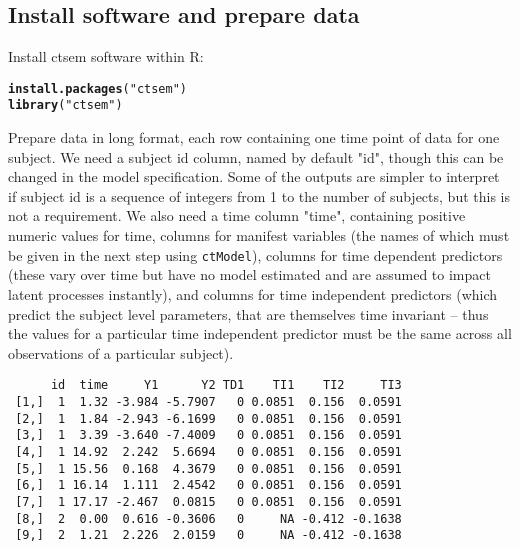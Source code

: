 \documentclass[11pt]{article}\usepackage[]{graphicx}\usepackage[]{color}
\makeatletter
\newcommand{\hlstr}[1]{\textcolor[rgb]{0.192,0.494,0.8}{#1}}%
\newcommand{\hlstd}[1]{\textcolor[rgb]{0.345,0.345,0.345}{#1}}%
\newcommand{\hlkwd}[1]{\textcolor[rgb]{0.737,0.353,0.396}{\textbf{#1}}}%
\newenvironment{kframe}{%
 \def\at@end@of@kframe{}%
 \ifinner\ifhmode%
  \def\at@end@of@kframe{\end{minipage}}%
  \begin{minipage}{\columnwidth}%
 \fi\fi%
 \def\FrameCommand##1{\hskip\@totalleftmargin \hskip-\fboxsep
 \colorbox{shadecolor}{##1}\hskip-\fboxsep
     \hskip-\linewidth \hskip-\@totalleftmargin \hskip\columnwidth}%
 \MakeFramed {\advance\hsize-\width
   \@totalleftmargin\z@ \linewidth\hsize
   \@setminipage}}%
 {\par\unskip\endMakeFramed%
 \at@end@of@kframe}
\newenvironment{knitrout}{}{} %
\makeatother
\begin{document}
\subsection{Install software and prepare data}
Install ctsem software within R:

\begin{knitrout}\small
{}\color{fgcolor}\begin{kframe}
\begin{alltt}
\hlkwd{install.packages}\hlstd{(}\hlstr{"ctsem"}\hlstd{)}
\hlkwd{library}\hlstd{(}\hlstr{"ctsem"}\hlstd{)}
\end{alltt}
\end{kframe}
\end{knitrout}

Prepare data in long format, each row containing one time point of data for one subject. We need a subject id column, named by default "id", though this can be changed in the model specification. Some of the outputs are simpler to interpret if subject id is a sequence of integers from 1 to the number of subjects, but this is not a requirement. We also need a time column "time", containing positive numeric values for time, columns for manifest variables (the names of which must be given in the next step using \verb|ctModel|), columns for time dependent predictors (these vary over time but have no model estimated and are assumed to impact latent processes instantly), and columns for time independent predictors (which predict the subject level parameters, that are themselves time invariant -- thus the values for a particular time independent predictor must be the same across all observations of a particular subject).

\begin{knitrout}\footnotesize
{}\color{fgcolor}\begin{kframe}
\begin{verbatim}
      id  time     Y1      Y2 TD1    TI1    TI2     TI3
 [1,]  1  1.32 -3.984 -5.7907   0 0.0851  0.156  0.0591
 [2,]  1  1.84 -2.943 -6.1699   0 0.0851  0.156  0.0591
 [3,]  1  3.39 -3.640 -7.4009   0 0.0851  0.156  0.0591
 [4,]  1 14.92  2.242  5.6694   0 0.0851  0.156  0.0591
 [5,]  1 15.56  0.168  4.3679   0 0.0851  0.156  0.0591
 [6,]  1 16.14  1.111  2.4542   0 0.0851  0.156  0.0591
 [7,]  1 17.17 -2.467  0.0815   0 0.0851  0.156  0.0591
 [8,]  2  0.00  0.616 -0.3606   0     NA -0.412 -0.1638
 [9,]  2  1.21  2.226  2.0159   0     NA -0.412 -0.1638
\end{verbatim}
\end{kframe}
\end{knitrout}
\end{document}
